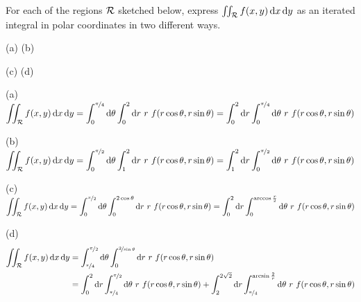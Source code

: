 \begin{question}
For each of the regions $\mathcal{R}$ sketched below, express 
$\iint_{\mathcal{R}} f(x,y)\,\mathrm{d}x\,\mathrm{d}y$ as an iterated integral in polar 
coordinates in two different ways.
\begin{center}
    (a)\quad {}\hfil
    (b)\quad {}
\end{center}
\begin{center}
    (c)\quad {}
                                                      \phantom{$y=x$}\hfil
    (d)\quad {}
\end{center}
\end{question}


\begin{answer}

(a)
$\displaystyle\iint_{\mathcal{R}} f(x,y)\,\mathrm{d}x\,\mathrm{d}y
=\int_0^{\nicefrac{\pi}{4}}\mathrm{d}\theta
 \int_0^2\mathrm{d}r\ r\ f(r\cos\theta,r\sin\theta)
=\int_0^2\mathrm{d}r
  \int_0^{\nicefrac{\pi}{4}}\mathrm{d}\theta
 \ r\ f(r\cos\theta,r\sin\theta)$

(b)
$\displaystyle\iint_{\mathcal{R}} f(x,y)\,\mathrm{d}x\,\mathrm{d}y
=\int_0^{\nicefrac{\pi}{2}}\mathrm{d}\theta
 \int_1^2\mathrm{d}r\ r\ f(r\cos\theta,r\sin\theta)
=\int_1^2\mathrm{d}r
  \int_0^{\nicefrac{\pi}{2}}\mathrm{d}\theta
 \ r\ f(r\cos\theta,r\sin\theta)$

(c)
$\displaystyle \iint_{\mathcal{R}} f(x,y)\,\mathrm{d}x\,\mathrm{d}y
=\int_0^{\nicefrac{\pi}{2}}\mathrm{d}\theta
 \int_0^{2\cos\theta}\mathrm{d}r\ r\ f(r\cos\theta,r\sin\theta)
=\int_0^2\mathrm{d}r
  \int_0^{\arccos\frac{r}{2}}\mathrm{d}\theta
 \ r\ f(r\cos\theta,r\sin\theta)$

(d)
\begin{align*}
\dblInt_\cR f(x,y)\,\dee{x}\,\dee{y}
&=\int_{\nicefrac{\pi}{4}}^{\nicefrac{\pi}{2}}\dee{\theta}
 \int_0^{\nicefrac{2}{\sin\theta}}\dee{r}\ r\ f(r\cos\theta,r\sin\theta)\\
&=\int_0^2\dee{r}
  \int_{\nicefrac{\pi}{4}}^{\nicefrac{\pi}{2}}\dee{\theta}
 \ r\ f(r\cos\theta,r\sin\theta)
+\int_2^{2\sqrt{2}}\dee{r}
  \int_{\nicefrac{\pi}{4}}^{\arcsin\frac{2}{r}}\dee{\theta}
 \ r\ f(r\cos\theta,r\sin\theta)
\end{align*}

\end{answer}

